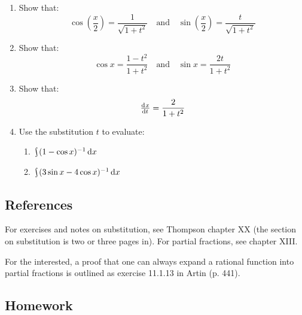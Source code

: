 \begin{enumerate}[resume]
    \begin{enumerate}
      \item Show that:
            \begin{displaymath}
              \cos\left( \frac{x}{2} \right) = \frac{1}{\sqrt{1 + t^2}} \quad\text{and}\quad \sin\left(\frac{x}{2}\right) = \frac{t}{\sqrt{1 + t^2}}
            \end{displaymath}
      \item Show that:
            \begin{displaymath}
              \cos x = \frac{1 - t^2}{1 + t^2} \quad\text{and}\quad \sin x = \frac{2t}{1 + t^2}
            \end{displaymath}
      \item Show that:
            \begin{displaymath}
              \od{x}{t} = \frac{2}{1 + t^2}
            \end{displaymath}
      \item Use the substitution $ t $ to evaluate:
        \begin{enumerate}
          \item $ \rint (1 - \cos x)^{-1} \dif{x} $
          \item $ \rint (3\sin x - 4\cos x)^{-1} \dif{x} $
        \end{enumerate}
    \end{enumerate}
\end{enumerate}

\subsection{References}
For exercises and notes on substitution, see Thompson chapter XX (the section on substitution
is two or three pages in). For partial fractions, see chapter XIII.

For the interested, a proof that one can always expand a rational function into partial fractions
is outlined as exercise 11.1.13 in Artin (p. 441).

\subsection{Homework}
